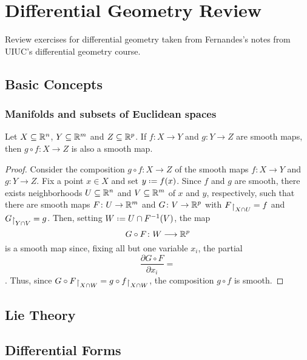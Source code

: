 \chapter{Differential Geometry Review}
Review exercises for differential geometry taken from Fernandes's notes
from UIUC's differential geometry course.
\section{Basic Concepts}
\subsection{Manifolds and subsets of Euclidean spaces}
\begin{proposition}
  Let \(X\subseteq\mathbb{R}^n\), \(Y\subseteq\mathbb{R}^m\) and
  \(Z\subseteq\mathbb{R}^p\). If \(f\colon X\to Y\) and \(g\colon Y\to Z\) are
  smooth maps, then \(g\circ f\colon X\to Z\) is also a smooth map.
\end{proposition}
\begin{proof}
  Consider the composition \(g\circ f\colon X\to Z\) of the smooth maps
  \(f\colon X\to Y\) and \(g\colon Y\to Z\). Fix a point \(x\in X\) and set
  \(y\defeq f(x)\). Since \(f\) and \(g\) are smooth, there exists
  neighborhoods \(U\subseteq\mathbb{R}^n\) and \(V\subseteq\mathbb{R}^m\) of \(x\) and
  \(y\), respectively, such that there are smooth maps
  \(F\colon U\to\mathbb{R}^m\) and \(G\colon V\to\mathbb{R}^p\) with
  \(F\restrict{X\cap U}=f\) and \(G\restrict{Y\cap V}=g\). Then, setting
  \(W\defeq U\cap F^{-1}(V)\), the map
  \[
    G\circ F\colon W\longrightarrow\mathbb{R}^p
  \]
  is a smooth map since, fixing all but one variable \(x_i\), the partial
  \[
    \frac{\partial G\circ F}{\partial x_i}=
  \]
  . Thus, since
  \(G\circ F\restrict{X\cap W}=g\circ f\restrict{X\cap W}\), the
  composition \(g\circ f\) is smooth.
\end{proof}

\section{Lie Theory}
\section{Differential Forms}


